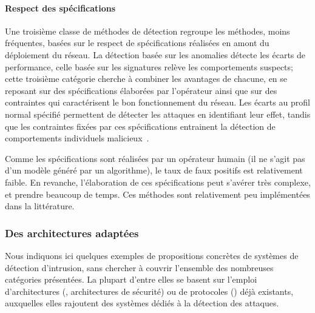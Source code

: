         \paragraph{Respect des spécifications}
Une troisième classe de méthodes de détection regroupe les méthodes, moins fréquentes, basées sur le respect de spécifications réalisées en amont du déploiement du réseau.
La détection basée sur les anomalies détecte les écarts de performance, celle basée sur les signatures relève les comportements suspects; cette troisième catégorie cherche à combiner les avantages de chacune, en se reposant sur des spécifications élaborées par l'opérateur ainsi que sur des contraintes qui caractérisent le bon fonctionnement du réseau.
Les écarts au profil normal spécifié permettent de détecter les attaques en identifiant leur effet, tandis que les contraintes fixées par ces spécifications entrainent la détection de comportements individuels malicieux~\cite{BMS13}.

Comme les spécifications sont réalisées par un opérateur humain (il ne s'agit pas d'un modèle généré par un algorithme), le taux de faux positifs est relativement faible.
En revanche, l'élaboration de ces spécifications peut s'avérer très complexe, et prendre beaucoup de temps.
Ces méthodes sont relativement peu implémentées dans la littérature.

    \subsubsection{Des architectures adaptées}
Nous indiquons ici quelques exemples de propositions concrètes de systèmes de détection d'intrusion, sans chercher à couvrir l'ensemble des nombreuses catégories présentées.
La plupart d'entre elles se basent sur l'emploi d'architectures (, architectures de sécurité) ou de protocoles () déjà existants, auxquelles elles rajoutent des systèmes dédiés à la détection des attaques.

